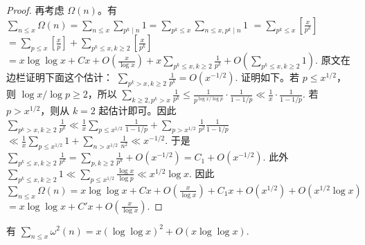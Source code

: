 \begin{proof}
	再考虑 $\Omega(n)$。有
	\(\textstyle \sum_{n\leq\allowbreak{} x}\Omega(n) =\allowbreak{} \sum_{n\leq\allowbreak{} x}\sum_{p^k\mid\allowbreak{} n}1 =\allowbreak{} \sum_{p^k\leq\allowbreak{} x}\sum_{n\leq\allowbreak{} x,\allowbreak{} p^k\mid\allowbreak{} n}1\) \(\textstyle =\allowbreak{} \sum_{p^k\leq\allowbreak{} x}\left[\frac{x}{p^k}\right]\) \(\textstyle =\allowbreak{} \sum_{p\leq\allowbreak{} x}\left[\frac xp\right] +\allowbreak{} \sum_{p^k\leq\allowbreak{} x,\allowbreak{} k\geq\allowbreak{} 2} \left[\frac{x}{p^k}\right]\) \(\textstyle =\allowbreak{} x\log\log x+\allowbreak{}Cx+\allowbreak{}O\left(\frac{x}{\log x}\right) +\allowbreak{} x\sum_{p^k\leq\allowbreak{} x,\allowbreak{} k\geq\allowbreak{} 2}\frac1{p^k} +\allowbreak{} O\left(\sum_{p^k\leq\allowbreak{} x,\allowbreak{} k\geq\allowbreak{} 2}1\right).\)
	原文在边栏证明下面这个估计：
	\(\textstyle \sum_{p^k>x,\allowbreak{} k\geq\allowbreak{} 2}\frac1{p^k} =\allowbreak{} O\left(x^{-1/2}\right).\)
	证明如下。若 $p\leq x^{1/2}$，则 $\log x/\log p\geq 2$，所以
	\(\textstyle \sum_{k\geq\allowbreak{} 2,\allowbreak{} p^k>x}\frac1{p^k} \leq\allowbreak{} \frac{1}{p^{\log x/\log p}}\cdot\frac1{1-1/p} \ll\allowbreak{} \frac1x\cdot\frac1{1-1/p}.\)
	若 $p>x^{1/2}$，则从 $k=2$ 起估计即可。因此
	\(\textstyle \sum_{p^k>x,\allowbreak{} k\geq\allowbreak{} 2}\frac1{p^k} \ll\allowbreak{} \frac1x\sum_{p\leq\allowbreak{} x^{1/2}}\frac1{1-1/p} +\allowbreak{} \sum_{p>x^{1/2}}\frac1{p^2}\frac1{1-1/p}\) \(\textstyle \ll\allowbreak{} \frac1x\sum_{p\leq\allowbreak{} x^{1/2}}1 +\allowbreak{} \sum_{n>x^{1/2}}\frac1{n^2} \ll\allowbreak{} x^{-1/2}.\)
	于是
	\(\textstyle \sum_{p^k\leq\allowbreak{} x,\allowbreak{} k\geq\allowbreak{} 2}\frac1{p^k} =\allowbreak{} \sum_{p,\allowbreak{} k\geq\allowbreak{} 2}\frac1{p^k} +\allowbreak{} O\left(x^{-1/2}\right) =\allowbreak{} C_1+\allowbreak{}O\left(x^{-1/2}\right).\)
	此外
	\(\textstyle \sum_{p^k\leq\allowbreak{} x,\allowbreak{} k\geq\allowbreak{} 2}1 \ll\allowbreak{} \sum_{p\leq\allowbreak{} x^{1/2}}\frac{\log x}{\log p} \ll\allowbreak{} x^{1/2}\log x.\)
	因此
	\(\textstyle \sum_{n\leq\allowbreak{} x}\Omega(n) =\allowbreak{} x\log\log x+\allowbreak{}Cx+\allowbreak{}O\left(\frac{x}{\log x}\right) +\allowbreak{} C_1x+\allowbreak{}O\left(x^{1/2}\right) +\allowbreak{} O\left(x^{1/2}\log x\right)\) \(\textstyle =\allowbreak{} x\log\log x+\allowbreak{}C'x+\allowbreak{}O\left(\frac{x}{\log x}\right).\)
\end{proof}

\begin{theorem}[原文 Theorem 3.10]
	有
	\(\textstyle \sum_{n\leq\allowbreak{} x}\omega^2(n) =\allowbreak{} x(\log\log x)^2+\allowbreak{}O(x\log\log x).\)
\end{theorem}

